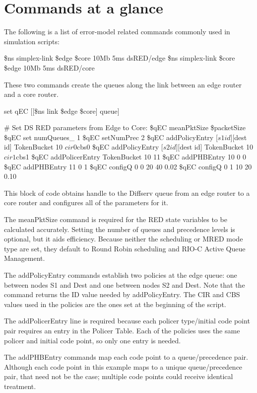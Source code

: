 \section{Commands at a glance}
\label{sec:diffservcommand}

The following is a list of error-model related commands commonly used in
simulation scripts:

\begin{program}
\$ns simplex-link \$edge \$core 10Mb 5ms dsRED/edge
\$ns simplex-link \$core \$edge 10Mb 5ms dsRED/core
\end{program}

These two commands create the queues along the link between an edge router and 
a core router.

\begin{program}
set qEC [[\$ns link \$edge \$core] queue]

# Set DS RED parameters from Edge to Core:
\$qEC meanPktSize \$packetSize
\$qEC set numQueues_ 1
\$qEC setNumPrec 2
\$qEC addPolicyEntry [$s1 id] [$dest id] TokenBucket 10 $cir0 $cbs0
\$qEC addPolicyEntry [$s2 id] [$dest id] TokenBucket 10 $cir1 $cbs1
\$qEC addPolicerEntry TokenBucket 10 11
\$qEC addPHBEntry 10 0 0
\$qEC addPHBEntry 11 0 1
\$qEC configQ 0 0 20 40 0.02
\$qEC configQ 0 1 10 20 0.10
\end{program}

This block of code obtains handle to the Diffserv queue from an edge router to
a core router and configures all of the parameters for it.

The meanPktSize command is required for the RED state variables to be calculated
accurately.  Setting the number of queues and precedence levels is optional, but
it aids efficiency. Because neither the scheduling or MRED mode type are set, 
they default to Round Robin scheduling and RIO-C Active Queue Management.

The addPolicyEntry commands establish two policies at the edge queue: one 
between nodes S1 and Dest and one between nodes S2 and Dest.  Note that the 
\code{[$s1 id]} command returns the ID value needed by addPolicyEntry.  The CIR and CBS values used in the policies are the ones set at the beginning of the script.

The addPolicerEntry line is required because each policer type/initial code point pair requires an entry in the Policer Table.  Each of the policies uses the same policer and initial code point, so only one entry is needed.

The addPHBEntry commands map each code point to a queue/precedence pair.  Although each code point in this example maps to a unique queue/precedence pair, that need not be the case; multiple code points could receive identical treatment.

